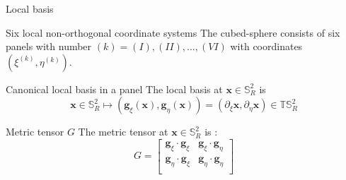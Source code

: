 \documentclass[11pt]{beamer}
\begin{document}
\begin{frame}{Local basis}
\begin{block}{Six local non-orthogonal coordinate systems}
The cubed-sphere consists of six panels with number $(k)=(I),(II),\dots, (VI)$
with coordinates $(\xi^{(k)}, \eta^{(k)})$.
\end{block}
\begin{block}{Canonical local basis in a panel}
The local basis at $\mathbf{x} \in \mathbb{S}^2_R$ is
\begin{equation}
\mathbf{x} \in \mathbb{S}^2_R \mapsto (\mathbf{g}_\xi(\mathbf{x}),\mathbf{g}_\eta(\mathbf{x}))
=(\partial_\xi \mathbf{x}, \partial_\eta \mathbf{x}) \in \mathbb{T}\mathbb{S}^2_R
\end{equation}
\end{block}
\begin{block}{Metric tensor $G$ }
The metric tensor at $\mathbf{x} \in \mathbb{S}_R^2$ is :
\begin{equation}
\label{eq:1001.3}
G=\left[ \begin{array}{cc}
\mathbf{g}_{\xi} \cdot \mathbf{g}_{\xi} & \mathbf{g}_{\xi} \cdot \mathbf{g}_{\eta} \\
\mathbf{g}_{\eta} \cdot \mathbf{g}_{\xi} & \mathbf{g}_{\eta} \cdot \mathbf{g}_{\eta} \\
\end{array} \right] 
\end{equation}
\end{block}
\end{frame}
\end{document}
